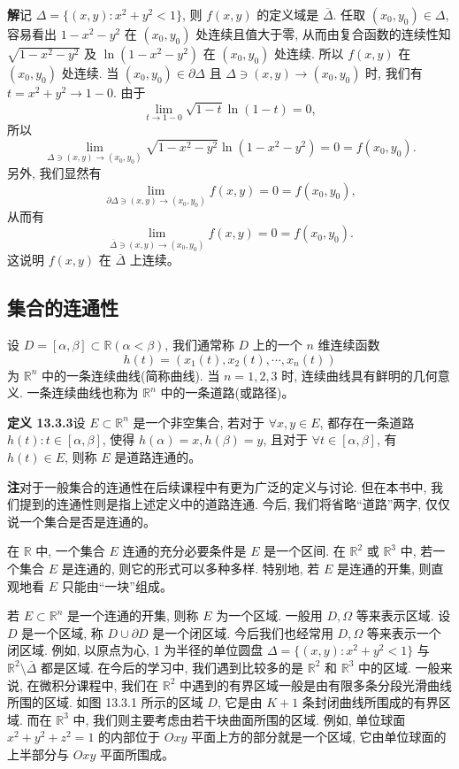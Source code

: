 \documentclass[UTF8, 12pt, fontset=fandol, oneside]{ctexart}
\begin{document}
\noindent\textbf{解}\quad 记 $\Delta=\{(x,y):x^2+y^2<1\}$, 则 $f(x,y)$ 的定义域是 $\overline\Delta$. 任取 $(x_0,y_0)\in\Delta$, 容易看出 $1-x^2-y^2$ 在 $(x_0,y_0)$ 处连续且值大于零, 从而由复合函数的连续性知 $\sqrt{1-x^2-y^2}$ 及 $\ln(1-x^2-y^2)$ 在 $(x_0,y_0)$ 处连续. 所以 $f(x,y)$ 在 $(x_0,y_0)$ 处连续. 当 $(x_0,y_0)\in\partial\Delta$ 且 $\Delta\ni(x,y)\to(x_0,y_0)$ 时, 我们有 $t=x^2+y^2\to1-0$. 由于
\[
  \lim_{t\to1-0}\sqrt{1-t}\ln(1-t)=0,
\]
所以
\[
  \lim_{\Delta\ni(x,y)\to(x_0,y_0)}
  \sqrt{1-x^2-y^2}\ln(1-x^2-y^2)=0=f(x_0,y_0).
\]
另外, 我们显然有
\[
  \lim_{\partial\Delta\ni(x,y)\to(x_0,y_0)}f(x,y)=0=f(x_0,y_0),
\]
从而有
\[
  \lim_{\overline\Delta\ni(x,y)\to(x_0,y_0)}f(x,y)=0=f(x_0,y_0).
\]
这说明 $f(x,y)$ 在 $\overline\Delta$ 上连续。

\subsection{集合的连通性}

设 $D=[\alpha,\beta]\subset\mathbb R(\alpha<\beta)$, 我们通常称 $D$ 上的一个 $n$ 维连续函数
\[
  h(t)=(x_1(t),x_2(t),\cdots,x_n(t))
\]
为 $\mathbb R^n$ 中的一条连续曲线(简称曲线). 当 $n=1,2,3$ 时, 连续曲线具有鲜明的几何意义. 一条连续曲线也称为 $\mathbb R^n$ 中的一条道路(或路径)。

\noindent\textbf{定义 13.3.3}\quad 设 $E\subset\mathbb R^n$ 是一个非空集合, 若对于 $\forall x,y\in E$, 都存在一条道路 $h(t):t\in[\alpha,\beta]$, 使得 $h(\alpha)=x,h(\beta)=y$, 且对于 $\forall t\in[\alpha,\beta]$, 有 $h(t)\in E$, 则称 $E$ 是道路连通的。

\noindent\textbf{注}\quad 对于一般集合的连通性在后续课程中有更为广泛的定义与讨论. 但在本书中, 我们提到的连通性则是指上述定义中的道路连通. 今后, 我们将省略``道路''两字, 仅仅说一个集合是否是连通的。

在 $\mathbb R$ 中, 一个集合 $E$ 连通的充分必要条件是 $E$ 是一个区间. 在 $\mathbb R^2$ 或 $\mathbb R^3$ 中, 若一个集合 $E$ 是连通的, 则它的形式可以多种多样. 特别地, 若 $E$ 是连通的开集, 则直观地看 $E$ 只能由``一块''组成。

若 $E\subset\mathbb R^n$ 是一个连通的开集, 则称 $E$ 为一个区域. 一般用 $D,\Omega$ 等来表示区域. 设 $D$ 是一个区域, 称 $D\cup\partial D$ 是一个闭区域. 今后我们也经常用 $D,\Omega$ 等来表示一个闭区域. 例如, 以原点为心, 1 为半径的单位圆盘 $\Delta=\{(x,y):x^2+y^2<1\}$ 与 $\mathbb R^2\setminus\overline\Delta$ 都是区域. 在今后的学习中, 我们遇到比较多的是 $\mathbb R^2$ 和 $\mathbb R^3$ 中的区域. 一般来说, 在微积分课程中, 我们在 $\mathbb R^2$ 中遇到的有界区域一般是由有限多条分段光滑曲线所围的区域. 如图 13.3.1 所示的区域 $D$, 它是由 $K+1$ 条封闭曲线所围成的有界区域. 而在 $\mathbb R^3$ 中, 我们则主要考虑由若干块曲面所围的区域. 例如, 单位球面 $x^2+y^2+z^2=1$ 的内部位于 $Oxy$ 平面上方的部分就是一个区域, 它由单位球面的上半部分与 $Oxy$ 平面所围成。
\end{document}
